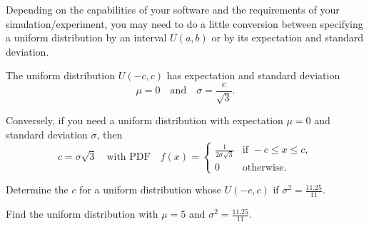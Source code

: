 \documentclass[../main.tex]{subfiles}
\begin{document}
%

\clearpage

Depending on the capabilities of your software and the requirements of your simulation/experiment, you may need to do a little conversion between specifying a uniform distribution by an interval \(U(a,b)\) or by its expectation and standard deviation.

\begin{method} \label{method:uniform-mean-stddev}
  The uniform distribution \(U(-c,c)\) has expectation and standard deviation
  \[
    \mu = 0
    \quad\text{and}\quad
    \sigma = \frac{c}{\sqrt{3}}.
  \]

  Conversely, if you need a uniform distribution with expectation \(\mu = 0\) and standard deviation \(\sigma\), then 
  \[
    c = \sigma \sqrt{3}
    \quad\text{with PDF}\quad
    f(x) = 
    \begin{cases}
      \frac{1}{2\sigma \sqrt{3}} &\text{if } -c \le x \le c, \\[2ex]
      0 &\text{otherwise}.
    \end{cases}
  \]
\end{method}


\begin{example} \label{ex:uniform-distribution-from-mean-and-stddev}
  Determine the \(c\) for a uniform distribution whose \(U(-c,c)\) if \(\sigma^{2} = \frac{11.25}{11}\).

\end{example}

\begin{example} \label{ex:uniform-from-mean-and-variance}
  Find the uniform distribution with \(\mu = 5\) and \(\sigma^{2} = \frac{11.25}{11}\).

\end{example}
\end{document}
